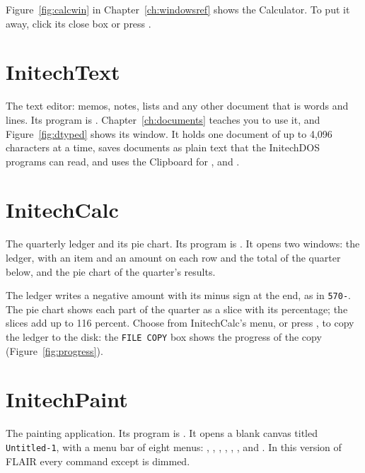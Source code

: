 Figure~\ref{fig:calcwin} in Chapter~\ref{ch:windowsref} shows the
Calculator.  To put it away, click its close box or press .

\section{InitechText}
The text editor: memos, notes, lists and any other document that is words
and lines.  Its program is .  Chapter~\ref{ch:documents}
teaches you to use it, and Figure~\ref{fig:dtyped} shows its window.  It
holds one document of up to 4,096 characters at a time, saves documents as
plain text that the InitechDOS programs can read, and uses the Clipboard
for ,  and .

\section{InitechCalc}
The quarterly ledger and its pie chart.  Its program is .
It opens two windows: the ledger, with an item and an amount on each row
and the total of the quarter below, and the pie chart of the quarter's
results.


The ledger writes a negative amount with its minus sign at the end, as in
\texttt{570-}.  The pie chart shows each part of the quarter as a slice
with its percentage; the slices add up to 116 percent.  Choose
 from InitechCalc's  menu, or press
, to copy the ledger to the disk: the \texttt{FILE COPY} box
shows the progress of the copy (Figure~\ref{fig:progress}).

\section{InitechPaint}
The painting application.  Its program is .  It opens a
blank canvas titled \texttt{Untitled-1}, with a menu bar of eight menus:
, , , ,
, ,  and .
In this version of FLAIR every command except  is dimmed.

